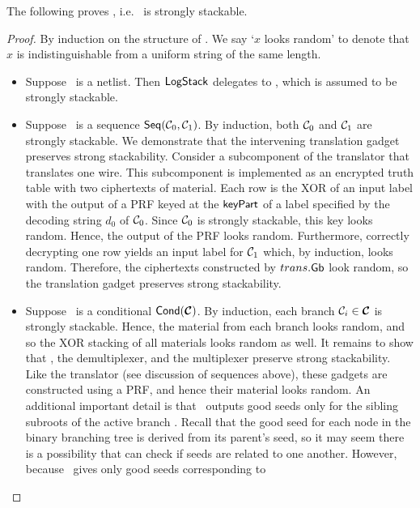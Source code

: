 The following proves , i.e. \ourschemelong\ is
strongly stackable.
\begin{proof}
  By induction on the structure of \cir.
  We say `$x$ looks random' to denote that $x$ is indistinguishable from a uniform string of the same length.
  \begin{itemize}
    \item Suppose \cir\ is a netlist.
      Then $\textsf{LogStack}$ delegates to \underscheme,
      which is assumed to be strongly stackable.
    \item Suppose \cir\ is a sequence $\textsf{Seq}(\mathcal C_0, \mathcal C_1)$.
      By induction,
      both $\mathcal C_0$ and $\mathcal C_1$ are strongly stackable.
      We demonstrate that the intervening translation
      gadget preserves strong stackability.
      Consider a subcomponent of the translator that translates one wire.
      This subcomponent is implemented as an encrypted truth table with two ciphertexts of material.
      Each row is the XOR of an input label with the
      output
      of a PRF keyed at the $\textsf{keyPart}$ of a label specified by the
      decoding string $d_0$ of $\mathcal C_0$.
      Since $\mathcal C_0$ is strongly stackable, this key looks random.
      Hence, the output of the PRF looks random.
      Furthermore, correctly decrypting one row yields an
      input label for $\mathcal C_1$ which, by induction, looks random.
      Therefore, the ciphertexts constructed by $trans.\textsf{Gb}$
      look random, so the translation gadget preserves strong stackability.
    \item Suppose \cir\ is a conditional $\conditional(\vec \cir)$.
      By induction, each branch $\cir_i \in \vec \cir$ is strongly
      stackable.
      Hence, the material from each branch looks random, and so the
      XOR stacking of all materials looks random as well.
      It remains to show that \gadget, the demultiplexer, and the multiplexer
      preserve strong stackability.
      Like the translator (see discussion of sequences
      above), these gadgets are constructed using a PRF, and hence
      their material looks random.
      An additional important detail is that \gadget\ outputs good
      seeds only for the sibling subroots of the active branch \aid.
      Recall that the good seed for each node in the binary branching
      tree is derived from its parent's seed, so it may seem there is
      a possibility that \E can check if seeds are related to one
      another.
      However, because \gadget\ gives only good seeds corresponding to

\end{itemize}
\end{proof}
